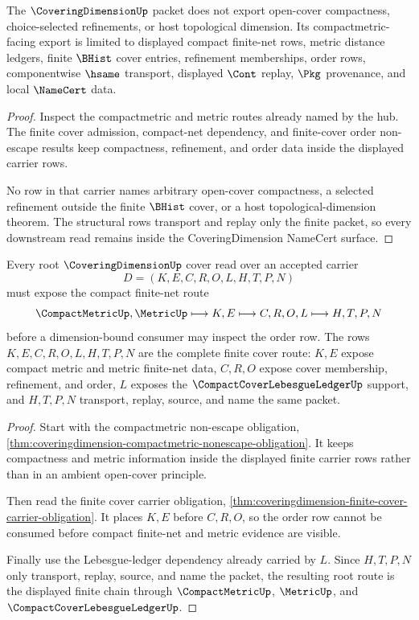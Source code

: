 \begin{theorem}
\label{thm:coveringdimension-compactmetric-nonescape-obligation}
The $\CoveringDimensionUp$ packet does not export open-cover compactness, choice-selected refinements, or host topological dimension. Its compactmetric-facing export is limited to displayed compact finite-net rows, metric distance ledgers, finite $\BHist$ cover entries, refinement memberships, order rows, componentwise $\hsame$ transport, displayed $\Cont$ replay, $\Pkg$ provenance, and local $\NameCert$ data.
\end{theorem}
\begin{proof}
Inspect the compactmetric and metric routes already named by the hub. The finite cover admission, compact-net dependency, and finite-cover order non-escape results keep compactness, refinement, and order data inside the displayed carrier rows.

No row in that carrier names arbitrary open-cover compactness, a selected refinement outside the finite $\BHist$ cover, or a host topological-dimension theorem. The structural rows transport and replay only the finite packet, so every downstream read remains inside the CoveringDimension NameCert surface.
\end{proof}

\begin{theorem}
\label{thm:coveringdimension-root-compact-net-cover-route}
Every root $\CoveringDimensionUp$ cover read over an accepted carrier
$$
D=(K,E,C,R,O,L,H,T,P,N)
$$
must expose the compact finite-net route
$$
\CompactMetricUp,\MetricUp \longmapsto K,E \longmapsto C,R,O,L \longmapsto H,T,P,N
$$
before a dimension-bound consumer may inspect the order row. The rows $K,E,C,R,O,L,H,T,P,N$ are the complete finite cover route: $K,E$ expose compact metric and metric finite-net data, $C,R,O$ expose cover membership, refinement, and order, $L$ exposes the $\CompactCoverLebesgueLedgerUp$ support, and $H,T,P,N$ transport, replay, source, and name the same packet.
\end{theorem}
\begin{proof}
Start with the compactmetric non-escape obligation, \autoref{thm:coveringdimension-compactmetric-nonescape-obligation}. It keeps compactness and metric information inside the displayed finite carrier rows rather than in an ambient open-cover principle.

Then read the finite cover carrier obligation, \autoref{thm:coveringdimension-finite-cover-carrier-obligation}. It places $K,E$ before $C,R,O$, so the order row cannot be consumed before compact finite-net and metric evidence are visible.

Finally use the Lebesgue-ledger dependency already carried by $L$. Since $H,T,P,N$ only transport, replay, source, and name the packet, the resulting root route is the displayed finite chain through $\CompactMetricUp$, $\MetricUp$, and $\CompactCoverLebesgueLedgerUp$.
\end{proof}

